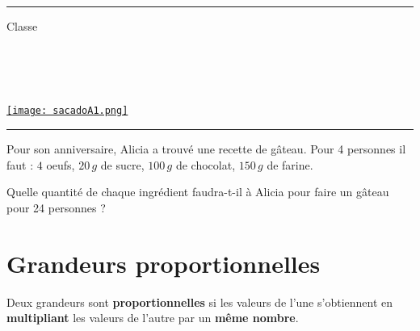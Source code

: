 \documentclass[a4paper,dvipsnames]{article}
\begin{document}

\fancyhead[C]{}
\hrule\medskip %
\begin{minipage}{0.295\textwidth} 
\raggedright
Classe \myClasse \hfill\\
\myDiscipline \hfill\\
\myParcours \hfill\\
\end{minipage}
\begin{minipage}{0.4\textwidth} 
\centering 
\scshape\huge
\textcolor{sacado_purple}{\myTitle} \\ 
\normalsize 
\end{minipage}
\begin{minipage}{0.295\textwidth} 
\raggedleft
\href{https://sacado.xyz/}{\texttt{[image: sacadoA1.png]}}
\end{minipage}
\medskip \hrule
\bigskip


\begin{ExOApp}[]
Pour son anniversaire, Alicia a trouvé une recette de gâteau. Pour 4 personnes il faut : $4$ oeufs, $20\,g$ de sucre, $100\,g$ de chocolat, $150\,g$ de farine.

Quelle quantité de chaque ingrédient faudra-t-il à Alicia pour faire un gâteau pour 24 personnes ?
\end{ExOApp}

\section{Grandeurs proportionnelles}

\begin{Def}
Deux grandeurs sont \textbf{proportionnelles} si les valeurs de l'une s'obtiennent en \textbf{multipliant} les valeurs de l'autre par un \textbf{même nombre}.
\end{Def}
\end{document}
